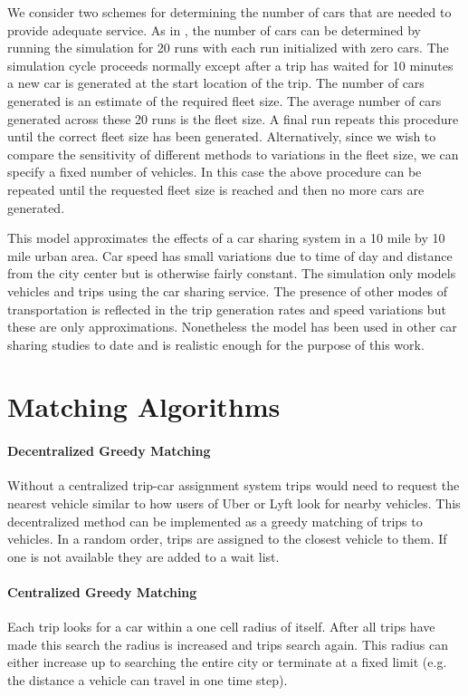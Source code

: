 \documentclass[letterpaper]{article}
\begin{document}
We consider two schemes for determining the number of cars that are needed to provide adequate service. As in \cite{fagnant2014travel}, the number of cars can be determined by running the simulation for 20 runs with each run initialized with zero cars. The simulation cycle proceeds normally except after a trip has waited for 10 minutes a new car is generated at the start location of the trip. The number of cars generated is an estimate of the required fleet size. The average number of cars generated across these 20 runs is the fleet size. A final run repeats this procedure until the correct fleet size has been generated. Alternatively, since we wish to compare the sensitivity of different methods to variations in the fleet size, we can specify a fixed number of vehicles. In this case the above procedure can be repeated until the requested fleet size is reached and then no more cars are generated.

This model approximates the effects of a car sharing system in a 10 mile by 10 mile urban area. Car speed has small variations due to time of day and distance from the city center but is otherwise fairly constant. The simulation only models vehicles and trips using the car sharing service. The presence of other modes of transportation is reflected in the trip generation rates and speed variations but these are only approximations. Nonetheless the model has been used in other car sharing studies \cite{fagnant2015operations} to date and is realistic enough for the purpose of this work. 

\section{Matching Algorithms}

\paragraph{Decentralized Greedy Matching}
Without a centralized trip-car assignment system trips would need to request the nearest vehicle similar to how users of Uber or Lyft look for nearby vehicles. This decentralized method can be implemented as a greedy matching of trips to vehicles. In a random order, trips are assigned to the closest vehicle to them. If one is not available they are added to a wait list. 

\paragraph{Centralized Greedy Matching}
Each trip looks for a car within a one cell radius of itself. After all trips have made this search the radius is increased and trips search again. This radius can either increase up to searching the entire city or terminate at a fixed limit (e.g. the distance a vehicle can travel in one time step).
\end{document}
